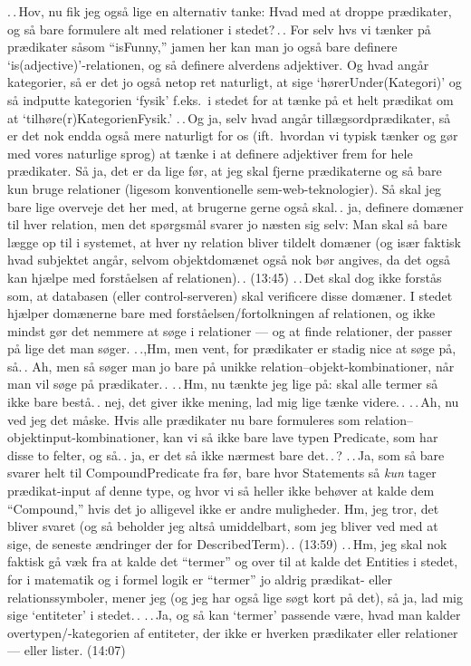 \documentclass{report}
\begin{document}
.\,.\,Hov, nu fik jeg også lige en alternativ tanke: Hvad med at droppe prædikater, og så bare formulere alt med relationer i stedet?\,.\,. For selv hvs vi tænker på prædikater såsom ``isFunny,'' jamen her kan man jo også bare definere `is(adjective)'-relationen, og så definere alverdens adjektiver. Og hvad angår kategorier, så er det jo også netop ret naturligt, at sige `hørerUnder(Kategori)' og så indputte kategorien `fysik' f.eks.\ i stedet for at tænke på et helt prædikat om at `tilhøre(r)KategorienFysik.' .\,.\,Og ja, selv hvad angår tillægsordprædikater, så er det nok endda også mere naturligt for os (ift.\ hvordan vi typisk tænker og gør med vores naturlige sprog) at tænke i at definere adjektiver frem for hele prædikater. Så ja, det er da lige før, at jeg skal fjerne prædikaterne og så bare kun bruge relationer (ligesom konventionelle sem-web-teknologier). Så skal jeg bare lige overveje det her med, at brugerne gerne også skal.\,. ja, definere domæner til hver relation, men det spørgsmål svarer jo næsten sig selv: Man skal så bare lægge op til i systemet, at hver ny relation bliver tildelt domæner (og især faktisk hvad subjektet angår, selvom objektdomænet også nok bør angives, da det også kan hjælpe med forståelsen af relationen).\,. (13:45) .\,.\,Det skal dog ikke forstås som, at databasen (eller control-serveren) skal verificere disse domæner. I stedet hjælper domænerne bare med forståelsen/fortolkningen af relationen, og ikke mindst gør det nemmere at søge i relationer --- og at finde relationer, der passer på lige det man søger. .\,.,Hm, men vent, for prædikater er stadig nice at søge på, så.\,. Ah, men så søger man jo bare på unikke relation--objekt-kombinationer, når man vil søge på prædikater.\,. .\,.\,Hm, nu tænkte jeg lige på: skal alle termer så ikke bare bestå.\,. nej, det giver ikke mening, lad mig lige tænke videre.\,. .\,.\,Ah, nu ved jeg det måske. Hvis alle prædikater nu bare formuleres som relation--objektinput-kombinationer, kan vi så ikke bare lave typen Predicate, som har disse to felter, og så.\,. ja, er det så ikke nærmest bare det.\,.\,? .\,.\,Ja, som så bare svarer helt til CompoundPredicate fra før, bare hvor Statements så \emph{kun} tager prædikat-input af denne type, og hvor vi så heller ikke behøver at kalde dem ``Compound,'' hvis det jo alligevel ikke er andre muligheder. Hm, jeg tror, det bliver svaret (og så beholder jeg altså umiddelbart, som jeg bliver ved med at sige, de seneste ændringer der for DescribedTerm).\,. (13:59) .\,.\,Hm, jeg skal nok faktisk gå væk fra at kalde det ``termer'' og over til at kalde det Entities i stedet, for i matematik og i formel logik er ``termer'' jo aldrig prædikat- eller relationssymboler, mener jeg (og jeg har også lige søgt kort på det), så ja, lad mig sige `entiteter' i stedet.\,. .\,.\,Ja, og så kan `termer' passende være, hvad man kalder overtypen/-kategorien af entiteter, der ikke er hverken prædikater eller relationer --- eller lister. (14:07)
\end{document}
